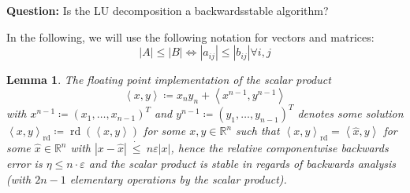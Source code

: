 \documentclass[a4paper]{article}
\newcounter{lecref}[section]
\numberwithin{lecref}{section}
\theoremstyle{break}
\newtheorem{lemma}[lecref]{Lemma}
\newcommand{\Abs}[1]{\left|#1\right|}
\newcommand{\IP}[2]{\left\langle#1, #2\right\rangle}
\newcommand{\dotted}[1]{\:\dot{#1}\:}  %
\begin{document}
\textbf{Question:} Is the LU decomposition a backwardsstable algorithm?

In the following, we will use the following notation for vectors and matrices:
\[ \Abs{A} \leq \Abs{B} \iff \Abs{a_{ij}} \leq \Abs{b_{ij}} \forall i,j \]

\begin{lemma}
  \label{lemma:2-16}
  The floating point implementation of the scalar product
  \[ \IP{x}{y} \coloneqq x_n y_n + \IP{x^{n-1}}{y^{n-1}} \]
  with $x^{n-1} \coloneqq (x_1, \dots, x_{n-1})^T$ and $y^{n-1} \coloneqq (y_1, \dots, y_{n-1})^T$
  denotes some solution $\IP{x}{y}_{\text{rd}} \coloneqq \operatorname{rd}(\IP{x}{y})$ for some $x, y \in \mathbb R^n$
  such that $\IP{x}{y}_{\operatorname{rd}} = \IP{\hat{x}}{y}$ for some $\hat{x} \in \mathbb R^n$ with $\Abs{x - \hat{x}} \dotted{\leq} n \varepsilon \Abs{x}$,
  hence the relative componentwise backwards error is $\eta \leq n \cdot \varepsilon$
  and the scalar product is stable in regards of backwards analysis (with $2n-1$ elementary operations by the scalar product). %
\end{lemma}
\end{document}
